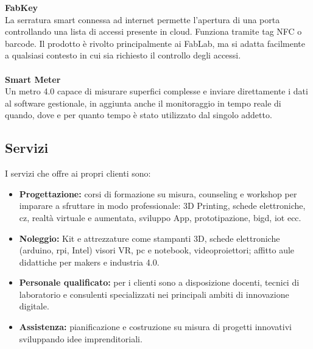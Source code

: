 \noindent \textbf{FabKey}
\\
La serratura smart connessa ad internet permette l'apertura di una porta controllando una lista di accessi presente in cloud. Funziona tramite tag \gls{NFC} o barcode. Il prodotto è rivolto principalmente ai \gls{FabLab}, ma si adatta facilmente a qualsiasi contesto in cui sia richiesto il controllo degli accessi.
\\
\\
\textbf{Smart Meter}
\\
Un metro 4.0 capace di misurare superfici complesse e inviare direttamente i dati al software gestionale, in aggiunta anche il monitoraggio in tempo reale di quando, dove e per quanto tempo è stato utilizzato dal singolo addetto.

\subsection{Servizi}
I servizi che \lab{} offre ai propri clienti sono:
\begin{itemize}
\item \textbf{Progettazione:} corsi di formazione su misura, \gls{counseling} e \gls{workshop} per imparare a sfruttare in modo professionale: 3D Printing, schede elettroniche, \gls{cz}, realtà virtuale e aumentata, sviluppo App, prototipazione, \gls{bigd}, \gls{iot} ecc.
\item \textbf{Noleggio:} Kit e attrezzature come stampanti 3D, schede elettroniche (\gls{arduino}, \gls{rpi}, Intel) visori VR, pc e notebook, videoproiettori; affitto aule didattiche per \gls{makers} e industria 4.0.
\item \textbf{Personale qualificato:} per i clienti sono a disposizione docenti, tecnici di laboratorio e consulenti specializzati nei principali ambiti di innovazione digitale.
\item \textbf{Assistenza:} pianificazione e costruzione su misura di progetti innovativi sviluppando idee imprenditoriali.
\end{itemize}

